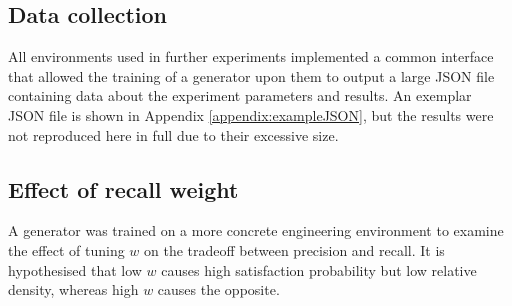 \documentclass[../../main.tex]{subfiles}
\begin{document}
\subsection{Data collection} \label{subsection:dataCollection}

All environments used in further experiments implemented a common interface that allowed the training of a generator upon them to output a large JSON file containing data about the experiment parameters and results.
An exemplar JSON file is shown in Appendix \ref{appendix:exampleJSON}, but the results were not reproduced here in full due to their excessive size.

\subsection{Effect of recall weight} \label{subsection:effectOfRecallWeight}

A generator was trained on a more concrete engineering environment to examine the effect of tuning $w$ on the tradeoff between precision and recall.
It is hypothesised that low $w$ causes high satisfaction probability but low relative density, whereas high $w$ causes the opposite.
\end{document}
